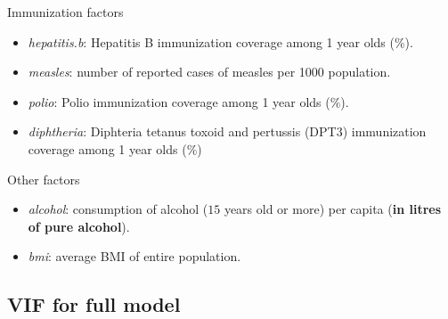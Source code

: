 Immunization factors
\begin{itemize}
	\item \textit{hepatitis.b}: Hepatitis B immunization coverage among 1 year olds (\%).
	\item \textit{measles}: number of reported cases of measles per 1000 population.
	\item \textit{polio}: Polio immunization coverage among 1 year olds (\%).
	\item \textit{diphtheria}: Diphteria tetanus toxoid and pertussis (DPT3) immunization coverage among 1 year olds (\%)
\end{itemize}

Other factors
\begin{itemize}
	\item \textit{alcohol}: consumption of alcohol ($15$ years old or more) per capita (\textbf{in litres of pure alcohol}).
	\item \textit{bmi}: average BMI of entire population.
\end{itemize}

\subsection*{VIF for full model}

